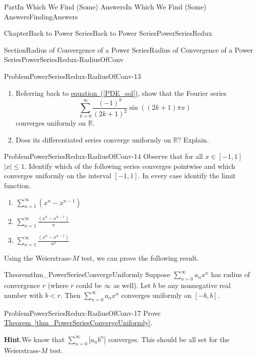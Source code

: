 \documentclass[oneside,10pt,]{book}
\newcommand{\blocktitlefont}{\relax}
\newcommand{\xreffont}{\relax}
\numberwithin{equation}{part}
\newcommand{\abs}[1]{\left|#1\right|}
\newcommand{\RR}{\mathbb {R}}
\newcommand{\lt}{<}
\begin{document}
\begin{partptx}{Part}{In Which We Find (Some) Answers}{}{In Which We Find (Some) Answers}{}{}{FindingAnswers}
\begin{chapterptx}{Chapter}{Back to Power Series}{}{Back to Power Series}{}{}{PowerSeriesRedux}
\begin{sectionptx}{Section}{Radius of Convergence of a Power Series}{}{Radius of Convergence of a Power Series}{}{}{PowerSeriesRedux-RadiusOfConv}
\begin{problem}{Problem}{}{PowerSeriesRedux-RadiusOfConv-13}
\begin{enumerate}[font=\bfseries,label=(\alph*),ref=\alph*]%
\item{}Referring back to \hyperref[PDE_sol]{equation~({\xreffont\ref{PDE_sol}})}, show that the Fourier series%
\begin{equation*}
\sum_{k=0}^\infty\frac{(-1)^k}{(2k+1)^2}\sin\left((2k+1)\pi x\right)
\end{equation*}
converges uniformly on \(\RR\).%
\item{}Does its differentiated series converge uniformly on \(\RR?\) Explain.%
\end{enumerate}%
\end{problem}
\begin{problem}{Problem}{}{PowerSeriesRedux-RadiusOfConv-14}%
Observe that for all \(x \in [-1,1]\) \(\abs{x}\le
1\).  Identify which of the following series converges pointwise and which converges uniformly on the interval \([-1,1]\).  In every case identify the limit function.%
\begin{enumerate}[font=\bfseries,label=(\alph*),ref=\alph*]%
\item{}\(\displaystyle \sum_{n=1}^\infty\left(x^n-x^{n-1}\right)\)%
\item{}\(\displaystyle \sum_{n=1}^\infty\frac{\left(x^n-x^{n-1}\right)}{n}\)%
\item{}\(\sum_{n=1}^\infty\frac{\left(x^n-x^{n-1}\right)}{n^2}\)%
\end{enumerate}%
\end{problem}
Using the Weierstrass-\(M\) test, we can prove the following result.%
\begin{theorem}{Theorem}{}{}{thm_PowerSeriesConvergeUniformly}%
 Suppose \(\sum_{n=0}^\infty a_nx^n\) has radius of convergence \(r\) (where \(r\) could be \(\infty\) as well).  Let \(b\) be any nonnegative real number with \(b\lt r\).  Then \(\sum_{n=0}^\infty a_nx^n\) converges uniformly on \([-b,b]\).%
\end{theorem}
\begin{problem}{Problem}{}{PowerSeriesRedux-RadiusOfConv-17}%
Prove \hyperref[thm_PowerSeriesConvergeUniformly]{Theorem~{\xreffont\ref{thm_PowerSeriesConvergeUniformly}}}.%
\par\smallskip%
\noindent\textbf{\blocktitlefont Hint}.\hypertarget{PowerSeriesRedux-RadiusOfConv-17-3}{}\quad{}We know that \(\sum_{n=0}^\infty|a_nb^n|\) converges. This should be all set for the Weierstrass-\(M\) test.%
\end{problem}

\end{sectionptx}
\end{chapterptx}
\end{partptx}
\end{document}
